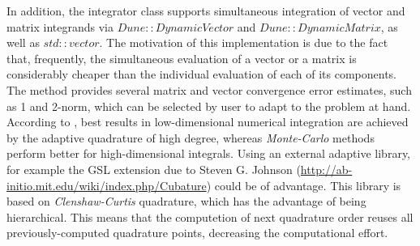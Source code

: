 \noindent
In addition, the integrator class supports simultaneous integration of vector and matrix integrands via $Dune::DynamicVector$ and $Dune::DynamicMatrix$, as well as $std::vector$. The motivation of this implementation is due to the fact that, frequently, the simultaneous evaluation of a vector or a matrix is considerably cheaper than the individual evaluation of each of its components. The method provides several matrix and vector convergence error estimates, such as 1 and 2-norm, which can be selected by user to adapt to the problem at hand.\\

\noindent
According to \cite{schurer2003}, best results in low-dimensional numerical integration are achieved by the adaptive quadrature of high degree, whereas \textit{Monte-Carlo} methods perform better for high-dimensional integrals. Using an external adaptive library, for example the GSL extension due to Steven G. Johnson (\url{http://ab-initio.mit.edu/wiki/index.php/Cubature}) could be of advantage. This library is based on \textit{Clenshaw-Curtis} quadrature, which has the advantage of being hierarchical. This means that the computetion of next quadrature order reuses all previously-computed quadrature points, decreasing the computational effort.

